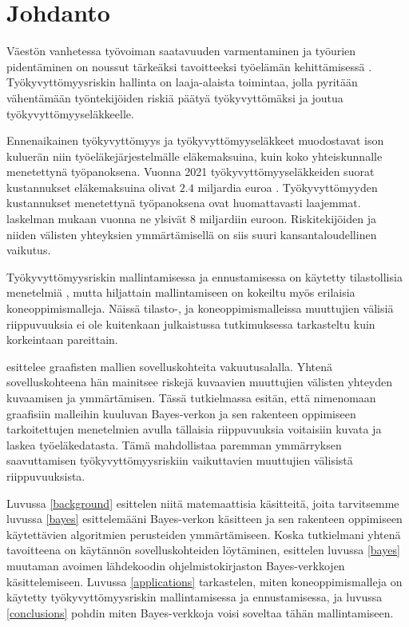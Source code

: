 \chapter{Johdanto\label{intro}} 

Väestön vanhetessa työvoiman saatavuuden varmentaminen ja työurien pidentäminen on noussut tärkeäksi tavoitteeksi työelämän kehittämisessä \citep{noauthor_paaministeri_2019}. Työkyvyttömyysriskin hallinta on laaja-alaista toimintaa, jolla pyritään vähentämään työntekijöiden riskiä päätyä työkyvyttömäksi ja joutua työkyvyttömyyseläkkeelle. 

Ennenaikainen työkyvyttömyys ja työkyvyttömyyseläkkeet muodostavat ison kuluerän niin työeläkejärjestelmälle eläkemaksuina, kuin koko yhteiskunnalle menetettynä työpanoksena. Vuonna 2021 työkyvyttömyyseläkkeiden suorat kustannukset eläkemaksuina olivat $2.4$ miljardia euroa \citep{etk_show_me_the_money}. Työkyvyttömyyden kustannukset menetettynä työpanoksena ovat huomattavasti laajemmat. \citet{rissanen_menetetyn_2014} laskelman mukaan vuonna ne ylsivät $8$ miljardiin euroon. Riskitekijöiden ja niiden välisten yhteyksien ymmärtämisellä on siis suuri kansantaloudellinen vaikutus. 

Työkyvyttömyysriskin mallintamisessa ja ennustamisessa on käytetty tilastollisia menetelmiä \citep{gross_machine_2020}, mutta hiljattain mallintamiseen on kokeiltu myös erilaisia koneoppimismalleja. Näissä tilasto-, ja koneoppimismalleissa muuttujien välisiä riippuvuuksia ei ole kuitenkaan julkaistussa tutkimuksessa tarkasteltu kuin korkeintaan pareittain. 

\citet{ramsahai_connecting_2020} esittelee graafisten mallien sovelluskohteita vakuutusalalla. Yhtenä sovelluskohteena hän mainitsee riskejä kuvaavien muuttujien välisten yhteyden kuvaamisen ja ymmärtämisen. Tässä tutkielmassa esitän, että nimenomaan graafisiin malleihin kuuluvan Bayes-verkon ja sen rakenteen oppimiseen tarkoitettujen menetelmien avulla tällaisia riippuvuuksia voitaisiin kuvata ja laskea työeläkedatasta. Tämä mahdollistaa paremman ymmärryksen saavuttamisen työkyvyttömyysriskiin vaikuttavien muuttujien välisistä riippuvuuksista. 

Luvussa \ref{background} esittelen niitä matemaattisia käsitteitä, joita tarvitsemme luvussa \ref{bayes} esittelemääni Bayes-verkon käsitteen ja sen rakenteen oppimiseen käytettävien algoritmien perusteiden ymmärtämiseen. Koska tutkielmani yhtenä tavoitteena on käytännön sovelluskohteiden löytäminen, esittelen luvussa \ref{bayes}  muutaman avoimen lähdekoodin ohjelmistokirjaston Bayes-verkkojen käsittelemiseen. Luvussa \ref{applications} tarkastelen, miten koneoppimismalleja on käytetty työkyvyttömyysriskin mallintamisessa ja ennustamisessa, ja luvussa \ref{conclusions} pohdin miten Bayes-verkkoja voisi soveltaa tähän mallintamiseen. 